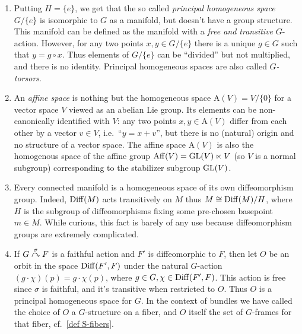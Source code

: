 \begin{example}\label{ex principal hom spaces}
    \begin{enumerate}
        \item Putting $H=\{e\}$, we get that the so called \emph{principal homogeneous space} $G\slash \{e\}$ is isomorphic to $G$ as a manifold, but doesn't have a group structure. This manifold can be defined as the manifold with a \emph{free and transitive} $G$-action. However, for any two points $x,y\in G\slash \{e\}$ there is a unique $g\in G$ such that $y=g\circ x$. Thus elements of $G\slash\{e\}$ can be ``divided'' but not multiplied, and there is no identity. Principal homogeneous spaces are also called \emph{$G$-torsors}.
        
        \item An \emph{affine space} is nothing but the homogeneous space $\mathrm{A}(V)=V\slash\{0\}$ for a vector space $V$ viewed as an abelian Lie group. Its elements can be non-canonically identified with $V$: any two points $x,y\in \mathrm{A}(V)$ differ from each other by a vector $v\in V$, i.e.\ ``$y=x+v$'', but there is no (natural) origin and no structure of a vector space. The affine space $\mathrm{A}(V)$ is also the homogenous space of the affine group $\operatorname{Aff}(V)=\operatorname{GL}(V)\ltimes V$ (so $V$ is a normal subgroup) corresponding to the stabilizer subgroup $\operatorname{GL}(V)$.

        \item Every connected manifold is a homogeneous space of its own diffeomorphism group. Indeed, $\operatorname{Diff}(M)$ acts transitively on $M$ thus $M\cong \operatorname{Diff}(M)\slash H$, where $H$ is the subgroup of diffeomorphisms fixing some pre-chosen basepoint $m\in M$. While curious, this fact is barely of any use because diffeomorphism groups are extremely complicated.
        
        \item If $G\overset{\sigma}{\curvearrowright}F$ is a faithful action and $F'$ is diffeomorphic to $F$, then let $O$ be an orbit in the space $\operatorname{Diff}(F',F)$ under the natural $G$-action $(g\cdot \chi)(p)=g\cdot\chi(p)$, where $g\in G,\chi\in\operatorname{Diff}(F',F)$. This action is free since $\sigma$ is faithful, and it's transitive when restricted to $O$. Thus $O$ is a principal homogeneous space for $G$. In the context of bundles we have called the choice of $O$ a $G$-structure on a fiber, and $O$ itself the set of $G$-frames for that fiber, cf.\ \ref{def S-fibers}.
    \end{enumerate}
\end{example}

